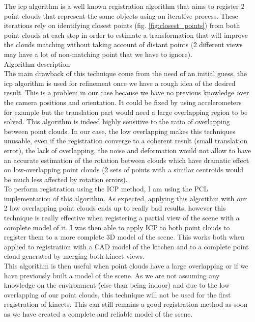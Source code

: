 The \acrlong{icp} algorithm is a well known registration algorithm that aims to register 2 point clouds that represent the same objects using an iterative process. These iterations rely on identifying closest points (fig. \ref{fig:closest_points}) from both point clouds at each step in order to estimate a transformation that will improve the clouds matching without taking account of distant points (2 different views may have a lot of non-matching point that we have to ignore). \\
Algorithm description \\
The main drawback of this technique come from the need of an initial guess, the \acrshort{icp} algorithm is used for refinement once we have a rough idea of the desired result. This is a problem in our case because we have no previous knowledge over the camera positions and orientation. It could be fixed by using accelerometers for example but the translation part would need a large overlapping region to be solved. This algorithm is indeed highly sensitive to the ratio of overlapping between point clouds. In our case, the low overlapping makes this techniques unusable, even if the registration converge to a coherent result (small translation error), the lack of overlapping, the noise and deformation would not allow to have an accurate estimation of the rotation between clouds which have dramatic effect on low-overlapping point clouds (2 sets of points with a similar centroids would be much less affected by rotation errors). \\
To perform registration using the ICP method, I am using the PCL implementation of this algorithm. As expected, applying this algorithm with our 2 low overlapping point clouds ends up to really bad results, however this technique is really effective when registering a partial view of the scene with a complete model of it. I was then able to apply ICP to both point clouds to register them to a more complete 3D model of the scene. This works both when applied to registration with a CAD model of the kitchen and to a complete point cloud generated by merging both kinect views. \\
This algorithm is then useful when point clouds have a large overlapping or if we have previously built a model of the scene. As we are not assuming any knowledge on the environment (else than being indoor) and due to the low overlapping of our point clouds, this technique will not be used for the first registration of kinects. This can still remains a good registration method as soon as we have created a complete and reliable model of the scene.

